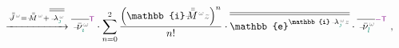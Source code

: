 \begin{subequations}
\begin{align}
	&\xrightarrow[]{\xint{\mathcolor{gray}{-}}{25}{\bar{\bar{J}}}^{\;\!\mathcolor{gray}{\omega}} = \xint{\mathcolor{gray}{-}}{18}{\bar{\bar{M}}}^{\;\!\mathcolor{gray}{\omega}} + \overline{\overline{\xint{\begin{smallmatrix} ~ \\ {}^{}_{\mathcolor{gray}{-}} \\ ~ \end{smallmatrix}}{22}{\lambda}^{\;\!\mathcolor{gray}{\omega}}_{\textcolor{PineGreen}{\jmath}}}}} \overline{\xint{\begin{smallmatrix} ~ \\ {}^{}_{\mathcolor{gray}{-}} \\ ~ \end{smallmatrix}}{15}{\bar{\nu}}^{\;\!\mathcolor{gray}{\omega}}_{\textcolor{PineGreen}{\imath}}}^{{\mathsf{\textcolor{Plum}{T}}}} \cdot \sum^{2}_{n=0} \frac{\left( \mathbb{i} \xint{\mathcolor{gray}{-}}{18}{\bar{\bar{M}}}^{\;\!\mathcolor{gray}{\omega}} \mathcolor{gray}{z} \right)^n}{n!} \cdot \overline{\overline{\mathbb{e}^{\mathbb{i} \xint{\begin{smallmatrix} ~ \\ {}^{}_{\mathcolor{gray}{-}} \\ ~ \end{smallmatrix}}{22}{\lambda}^{\;\!\mathcolor{gray}{\omega}}_{\textcolor{PineGreen}{\jmath}} \mathcolor{gray}{z}}}} \cdot \overline{\xint{\begin{smallmatrix} ~ \\ {}^{}_{\mathcolor{gray}{-}} \\ ~ \end{smallmatrix}}{15}{\bar{\nu}}^{\;\!\mathcolor{gray}{\omega}}_{\textcolor{PineGreen}{l}}}^{\textcolor{Plum}{-\mathsf{T}}} \label{eq:e^ikzz-Jordan_decompose4} ~,
\end{align}
\end{subequations}
